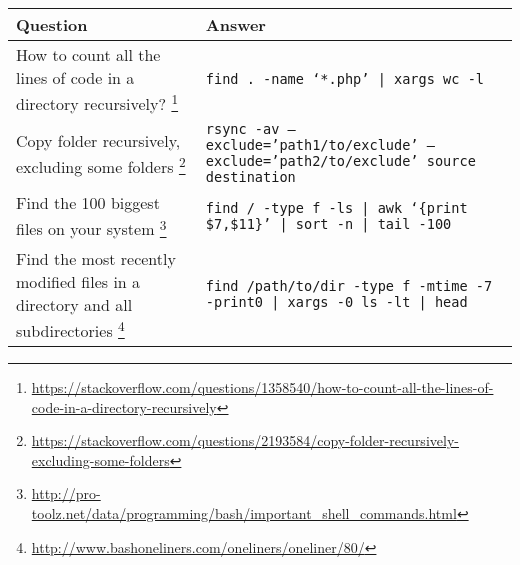 \begin{center}
\begin{tabular}{p{3in}p{3in}}
    \textbf{Question} & \textbf{Answer} \\
    \hline \hline
    How to count all the lines of code in a directory recursively?%
        \footnote{\url{https://stackoverflow.com/questions/1358540/how-to-count-all-the-lines-of-code-in-a-directory-recursively}} &
        \texttt{find . -name `*.php' | xargs wc -l} \\
    \hline
    Copy folder recursively, excluding some folders%
        \footnote{\url{https://stackoverflow.com/questions/2193584/copy-folder-recursively-excluding-some-folders}} &
        \texttt{rsync -av --exclude='path1/to/exclude' --exclude='path2/to/exclude' source destination} \\
     \hline
     Find the 100 biggest files on your system%
         \footnote{\url{http://pro-toolz.net/data/programming/bash/important_shell_commands.html}}&
         \texttt{find / -type f -ls | awk `\{print \$7,\$11\}' | sort -n | tail -100} \\
     \hline
     Find the most recently modified files in a directory and all subdirectories%
         \footnote{\url{http://www.bashoneliners.com/oneliners/oneliner/80/}}&
         \texttt{find /path/to/dir -type f -mtime -7 -print0 | xargs -0 ls -lt | head} \\
\end{tabular}
\end{center}


